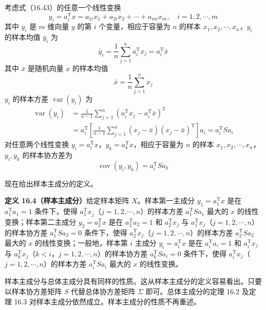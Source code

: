\documentclass[UTF8,12pt,a4paper,fontset=fandol]{ctexart}
\begin{document}
考虑式（16.43）的任意一个线性变换
\begin{equation}
y_i=a_i^{\mathrm{T}}x=a_{1i}x_1+a_{2i}x_2+\cdots+a_{mi}x_m,\quad i=1,2,\cdots,m
\tag{16.44}
\end{equation}
其中 $y_i$ 是 $m$ 维向量 $y$ 的第 $i$ 个变量，相应于容量为 $n$ 的样本 $x_1,x_2,\cdots,x_n$，$y_i$ 的样本均值 $\bar y_i$ 为
\begin{equation}
\bar y_i=\frac{1}{n}\sum_{j=1}^n a_i^{\mathrm{T}}x_j=a_i^{\mathrm{T}}\bar x
\tag{16.45}
\end{equation}
其中 $\bar x$ 是随机向量 $x$ 的样本均值
\[
\bar x=\frac{1}{n}\sum_{j=1}^n x_j
\]
$y_i$ 的样本方差 $\operatorname{var}(y_i)$ 为
\begin{equation}
\begin{aligned}
\operatorname{var}(y_i)
&=\frac{1}{n-1}\sum_{j=1}^n(a_i^{\mathrm{T}}x_j-a_i^{\mathrm{T}}\bar x)^2\\
&=a_i^{\mathrm{T}}\left[\frac{1}{n-1}\sum_{j=1}^n(x_j-\bar x)(x_j-\bar x)^{\mathrm{T}}\right]a_i
=a_i^{\mathrm{T}}Sa_i
\end{aligned}
\tag{16.46}
\end{equation}
对任意两个线性变换 $y_i=a_i^{\mathrm{T}}x$，$y_k=a_k^{\mathrm{T}}x$，相应于容量为 $n$ 的样本 $x_1,x_2,\cdots,x_n$，$y_i,y_k$ 的样本协方差为
\begin{equation}
\operatorname{cov}(y_i,y_k)=a_i^{\mathrm{T}}Sa_k
\tag{16.47}
\end{equation}

现在给出样本主成分的定义。

\noindent\textbf{定义 16.4（样本主成分）}\quad 给定样本矩阵 $X$。样本第一主成分 $y_1=a_1^{\mathrm{T}}x$ 是在 $a_1^{\mathrm{T}}a_1=1$ 条件下，使得 $a_1^{\mathrm{T}}x_j$（$j=1,2,\cdots,n$）的样本方差 $a_1^{\mathrm{T}}Sa_1$ 最大的 $x$ 的线性变换；样本第二主成分 $y_2=a_2^{\mathrm{T}}x$ 是在 $a_2^{\mathrm{T}}a_2=1$ 和 $a_2^{\mathrm{T}}x_j$ 与 $a_1^{\mathrm{T}}x_j$（$j=1,2,\cdots,n$）的样本协方差 $a_1^{\mathrm{T}}Sa_2=0$ 条件下，使得 $a_2^{\mathrm{T}}x_j$（$j=1,2,\cdots,n$）的样本方差 $a_2^{\mathrm{T}}Sa_2$ 最大的 $x$ 的线性变换；一般地，样本第 $i$ 主成分 $y_i=a_i^{\mathrm{T}}x$ 是在 $a_i^{\mathrm{T}}a_i=1$ 和 $a_i^{\mathrm{T}}x_j$ 与 $a_k^{\mathrm{T}}x_j$（$k<i$，$j=1,2,\cdots,n$）的样本协方差 $a_k^{\mathrm{T}}Sa_i=0$ 条件下，使得 $a_i^{\mathrm{T}}x_j$（$j=1,2,\cdots,n$）的样本方差 $a_i^{\mathrm{T}}Sa_i$ 最大的 $x$ 的线性变换。

样本主成分与总体主成分具有同样的性质。这从样本主成分的定义容易看出。只要以样本协方差矩阵 $S$ 代替总体协方差矩阵 $\Sigma$ 即可。总体主成分的定理 16.2 及定理 16.3 对样本主成分依然成立。样本主成分的性质不再重述。
\end{document}
